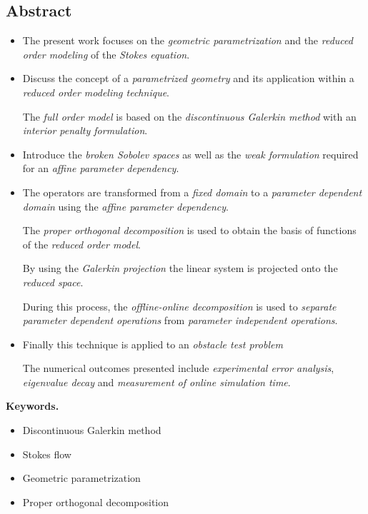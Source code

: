\documentclass{book}
\numberwithin{equation}{section}
\begin{document}
\subsection*{Abstract}
\begin{itemize}
    \item The present work focuses on the \textit{geometric parametrization} and the \textit{reduced order modeling} of the \textit{Stokes equation}.
    \item Discuss the concept of a \textit{parametrized
    geometry} and its application within a \textit{reduced order modeling technique}.
    
    The \textit{full order model} is based on the \textit{discontinuous Galerkin method} with an \textit{interior penalty formulation}.
    \item Introduce the \textit{broken Sobolev spaces} as well as the \textit{weak formulation} required for an \textit{affine parameter dependency}.
    \item The operators are transformed from a
    \textit{fixed domain} to a \textit{parameter dependent domain} using the \textit{affine parameter dependency}.
    
    The \textit{proper orthogonal decomposition} is used to obtain the basis of functions of the \textit{reduced order model}.
    
    By using the \textit{Galerkin projection} the linear system is projected onto the \textit{reduced space}.
    
    During this process, the \textit{offline-online decomposition} is used to \textit{separate parameter dependent operations} from \textit{parameter independent operations}.
    \item Finally this technique is applied to an \textit{obstacle test problem}
    
    The numerical outcomes presented include \textit{experimental error analysis}, \textit{eigenvalue decay} and \textit{measurement of online simulation time}.
\end{itemize}
\textbf{Keywords.}
\begin{itemize}
    \item Discontinuous Galerkin method
    \item Stokes flow
    \item Geometric parametrization
    \item Proper orthogonal decomposition
\end{itemize}

\end{document}
